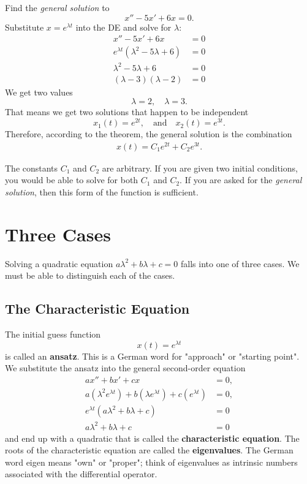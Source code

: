 \documentclass[10pt,letterpaper]{article}
\begin{document}
\begin{example}[1]{    
Find the \textit{general solution} to 
\[
x'' - 5x' + 6x = 0.
\]
}
Substitute $x=e^{\lambda t}$ into the DE and solve for $\lambda$:
\begin{align*}
    x'' - 5x' + 6x &= 0\\
    e^{\lambda t}(\lambda^2 - 5\lambda + 6)&=0\\
    \lambda^2 - 5\lambda + 6&=0\\
    (\lambda-3)(\lambda-2)&=0
\end{align*}
We get two values
\[
\lambda=2, \quad \lambda=3.
\]
That means we get two solutions that happen to be independent 
\[
x_1(t)=e^{2t}, \quad \text{and} \quad x_2(t)=e^{3t}.
\]
Therefore, according to the theorem, the general solution is the combination
\begin{align*}    
\boxed{
x(t)=C_1 e^{2t} + C_2 e^{3 t}.}
\end{align*}
\end{example}
The constants $C_1$ and $C_2$ are arbitrary. If you are given two initial conditions, you would be able to solve for both $C_1$ and $C_2$. If you are asked for the \textit{general solution}, then this form of the function is sufficient.



\section{Three Cases}
Solving a quadratic equation $a\lambda^2+b\lambda +c=0$ falls into one of three cases. We must be able to distinguish each of the cases.

\subsection{The Characteristic Equation}

The initial guess function
\[
x(t)=e^{\lambda t}
\]
is called an \textbf{ansatz}. This is a German word for "approach" or "starting point". We substitute the ansatz into the general second-order equation
\begin{align*}
    ax''+bx'+cx &= 0,\\
    a(\lambda^2e^{\lambda t})
        +b(\lambda e^{\lambda t})
        +c(e^{\lambda t}) &= 0,\\
    e^{\lambda t}
        \left(a\lambda^2+b\lambda+c\right) &= 0\\
a\lambda^2+b\lambda+c&=0
\end{align*}
and end up with a quadratic that is called the \textbf{characteristic equation}. The roots of the characteristic equation are called the \textbf{eigenvalues}. The German word eigen means "own" or "proper"; think of eigenvalues as intrinsic numbers associated with the differential operator. 
\end{document}
